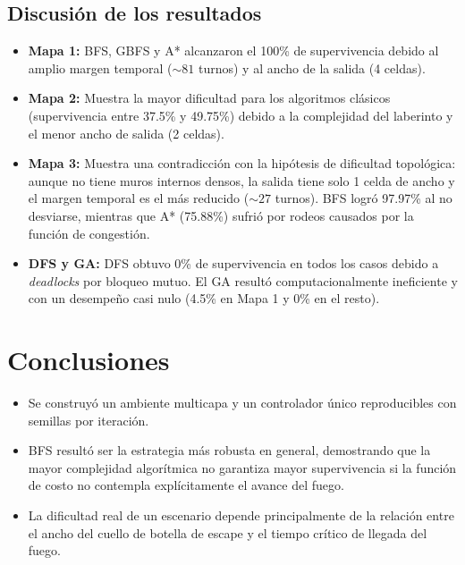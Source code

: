 \documentclass[11pt,a4paper]{article}
\begin{document}
\subsection{Discusión de los resultados}
\begin{itemize}
    \item \textbf{Mapa 1:} BFS, GBFS y A* alcanzaron el 100\% de supervivencia debido al amplio margen temporal ($\sim 81$ turnos) y al ancho de la salida (4 celdas).
    \item \textbf{Mapa 2:} Muestra la mayor dificultad para los algoritmos clásicos (supervivencia entre 37.5\% y 49.75\%) debido a la complejidad del laberinto y el menor ancho de salida (2 celdas).
    \item \textbf{Mapa 3:} Muestra una contradicción con la hipótesis de dificultad topológica: aunque no tiene muros internos densos, la salida tiene solo 1 celda de ancho y el margen temporal es el más reducido ($\sim 27$ turnos). BFS logró 97.97\% al no desviarse, mientras que A* (75.88\%) sufrió por rodeos causados por la función de congestión.
    \item \textbf{DFS y GA:} DFS obtuvo 0\% de supervivencia en todos los casos debido a \textit{deadlocks} por bloqueo mutuo. El GA resultó computacionalmente ineficiente y con un desempeño casi nulo (4.5\% en Mapa 1 y 0\% en el resto).
\end{itemize}

\section{Conclusiones}
\begin{itemize}
    \item Se construyó un ambiente multicapa y un controlador único reproducibles con semillas por iteración.
    \item BFS resultó ser la estrategia más robusta en general, demostrando que la mayor complejidad algorítmica no garantiza mayor supervivencia si la función de costo no contempla explícitamente el avance del fuego.
    \item La dificultad real de un escenario depende principalmente de la relación entre el ancho del cuello de botella de escape y el tiempo crítico de llegada del fuego.
\end{itemize}
\end{document}

